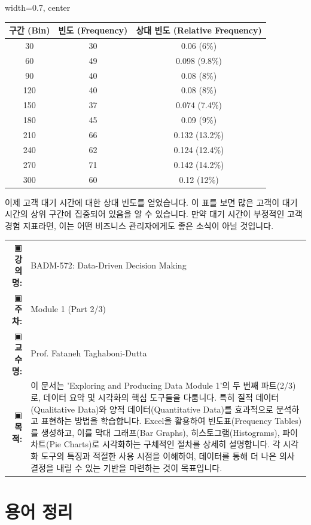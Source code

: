 \documentclass[11pt,a4paper]{article}
\makeatletter
\theoremstyle{definition}
\newcommand{\metainfo}[4]{
\begin{tcolorbox}[
    colback=lightpurple,
    colframe=darkpurple,
    boxrule=1pt,
    arc=2mm,
    left=10pt,
    right=10pt,
    top=8pt,
    bottom=8pt
]
\begin{tabular}{@{}rl@{}}
▣ \textbf{강의명:} & #1 \\[0.3em]
▣ \textbf{주차:} & #2 \\[0.3em]
▣ \textbf{교수명:} & #3 \\[0.3em]
▣ \textbf{목적:} & \begin{minipage}[t]{0.75\textwidth}#4\end{minipage}
\end{tabular}
\end{tcolorbox}
}
\makeatother
\begin{document}
\begin{tcolorbox}[title={상대 빈도 계산 (Calculating Relative Frequency)}]
\begin{center}
\label{tab:excel_frequency_relative_frequency_results}
\begin{adjustbox}{width=0.7\textwidth, center}
\begin{tabular}{ccc}
\toprule
\textbf{구간 (Bin)} & \textbf{빈도 (Frequency)} & \textbf{상대 빈도 (Relative Frequency)} \\
\midrule
30 & 30 & 0.06 (6\%) \\
60 & 49 & 0.098 (9.8\%) \\
90 & 40 & 0.08 (8\%) \\
120 & 40 & 0.08 (8\%) \\
150 & 37 & 0.074 (7.4\%) \\
180 & 45 & 0.09 (9\%) \\
210 & 66 & 0.132 (13.2\%) \\
240 & 62 & 0.124 (12.4\%) \\
270 & 71 & 0.142 (14.2\%) \\
300 & 60 & 0.12 (12\%) \\
\bottomrule
\end{tabular}
\end{adjustbox}
\end{center}
이제 고객 대기 시간에 대한 상대 빈도를 얻었습니다. 이 표를 보면 많은 고객이 대기 시간의 상위 구간에 집중되어 있음을 알 수 있습니다. 만약 대기 시간이 부정적인 고객 경험 지표라면, 이는 어떤 비즈니스 관리자에게도 좋은 소식이 아닐 것입니다.
\end{tcolorbox}

\newpage
\thispagestyle{firstpage}
\metainfo{BADM-572: Data-Driven Decision Making}{Module 1 (Part 2/3)}{Prof. Fataneh Taghaboni-Dutta}{이 문서는 'Exploring and Producing Data Module 1'의 두 번째 파트(2/3)로, 데이터 요약 및 시각화의 핵심 도구들을 다룹니다. 특히 질적 데이터(Qualitative Data)와 양적 데이터(Quantitative Data)를 효과적으로 분석하고 표현하는 방법을 학습합니다. Excel을 활용하여 빈도표(Frequency Tables)를 생성하고, 이를 막대 그래프(Bar Graphs), 히스토그램(Histograms), 파이 차트(Pie Charts)로 시각화하는 구체적인 절차를 상세히 설명합니다. 각 시각화 도구의 특징과 적절한 사용 시점을 이해하여, 데이터를 통해 더 나은 의사결정을 내릴 수 있는 기반을 마련하는 것이 목표입니다.}
\tableofcontents
\newpage

\section{용어 정리}
\end{document}
